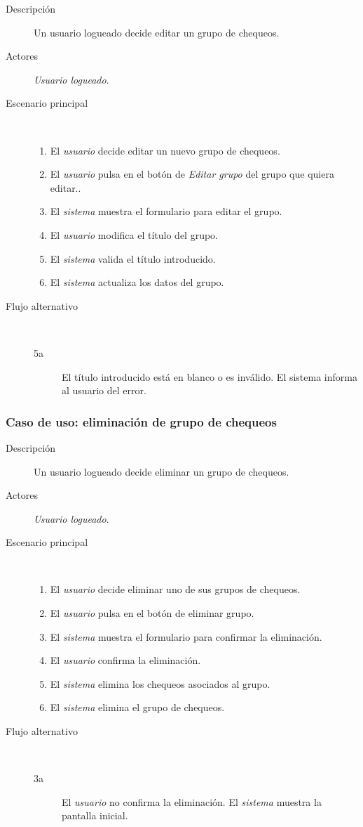 \begin{description}
\item[Descripción] Un usuario logueado decide editar un grupo de chequeos.
\item[Actores] \textit{Usuario logueado}.
\item[Escenario principal] $\quad$
  \begin{enumerate}
  \item El \textit{usuario} decide editar un nuevo grupo de chequeos.
  \item El \textit{usuario} pulsa en el botón de \textit{Editar grupo} del grupo que quiera editar..
  \item El \textit{sistema} muestra el formulario para editar el grupo.
  \item El \textit{usuario} modifica el título del grupo.
  \item El \textit{sistema} valida el título introducido.
  \item El \textit{sistema} actualiza los datos del grupo.
  \end{enumerate}
\item[Flujo alternativo] $\quad$

  \begin{description}
  \item[5a] El título introducido está en blanco o es inválido. El sistema
    informa al usuario del error.
  \end{description}
\end{description}


\subsubsection{Caso de uso: eliminación de grupo de chequeos}

\begin{description}
\item[Descripción] Un usuario logueado decide eliminar un grupo de chequeos.
\item[Actores] \textit{Usuario logueado}.
\item[Escenario principal] $\quad$
  \begin{enumerate}
  \item El \textit{usuario} decide eliminar uno de sus grupos de chequeos.
  \item El \textit{usuario} pulsa en el botón de eliminar grupo.
  \item El \textit{sistema} muestra el formulario para confirmar la eliminación.
  \item El \textit{usuario} confirma la eliminación.
  \item El \textit{sistema} elimina los chequeos asociados al grupo.
  \item El \textit{sistema} elimina el grupo de chequeos.
  \end{enumerate}
\item[Flujo alternativo] $\quad$
  \begin{description}
  \item[3a] El \textit{usuario} no confirma la eliminación. El \textit{sistema}
    muestra la pantalla inicial.
  \end{description}
\end{description}

